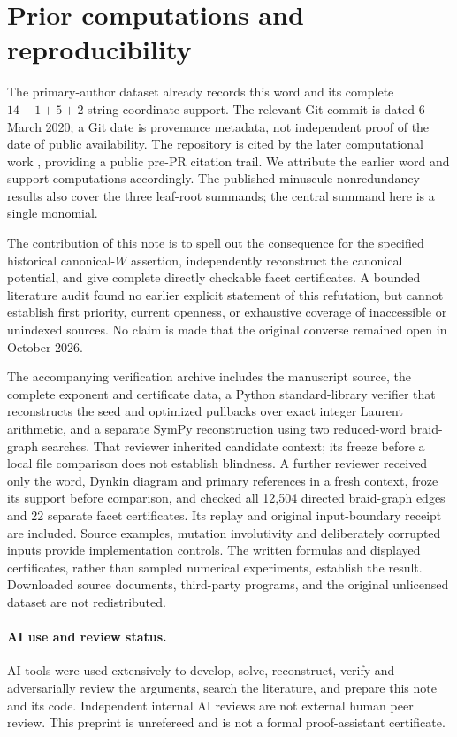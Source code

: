 \documentclass[11pt]{article}
\begin{document}
\section{Prior computations and reproducibility}\label{sec:priority}
The primary-author dataset \cite[Case~267]{DATA} already records this word
and its complete $14+1+5+2$ string-coordinate support. The relevant Git commit
is dated 6 March 2020; a Git date is provenance metadata, not independent
proof of the date of public availability. The repository is cited by the
later computational work \cite{KM}, providing a public pre-PR citation trail.
We attribute the earlier word and support computations accordingly.
The published minuscule nonredundancy results \cite{OWR,KS} also cover the
three leaf-root summands; the central summand here is a single monomial.

The contribution of this note is to spell out the consequence for the
specified historical canonical-$W$ assertion, independently reconstruct the
canonical potential, and give complete directly checkable facet certificates.
A bounded literature audit found no earlier explicit statement of this
refutation, but cannot establish first priority, current openness, or
exhaustive coverage of inaccessible or unindexed sources. No claim is made
that the original converse remained open in October 2026.

The accompanying verification archive includes the manuscript source,
the complete exponent and certificate data, a Python standard-library
verifier that reconstructs the seed and optimized pullbacks over exact
integer Laurent arithmetic, and a separate SymPy reconstruction using
two reduced-word braid-graph searches. That reviewer inherited candidate
context; its freeze before a local file comparison does not establish
blindness. A further reviewer received only the word, Dynkin diagram and
primary references in a fresh context, froze its support before comparison,
and checked all 12,504 directed braid-graph edges and 22 separate facet
certificates. Its replay and original input-boundary receipt are included.
Source examples, mutation involutivity and deliberately corrupted inputs
provide implementation controls. The written formulas and displayed certificates, rather than
sampled numerical experiments, establish the result. Downloaded source
documents, third-party programs, and the original unlicensed dataset are
not redistributed.

\paragraph{AI use and review status.}
AI tools were used extensively to develop, solve, reconstruct, verify and
adversarially review the arguments, search the literature, and prepare this
note and its code. Independent internal AI reviews are not external human
peer review. This preprint is unrefereed and is not a formal
proof-assistant certificate.
\end{document}
